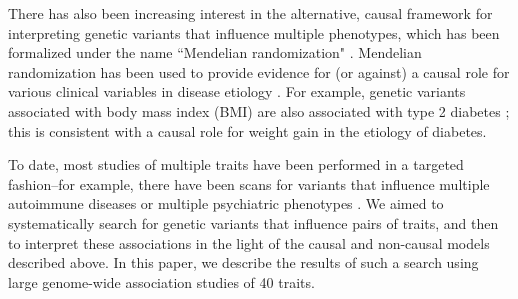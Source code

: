 \documentclass[11pt,titlepage]{article}
\begin{document}
There has also been increasing interest in the alternative, causal framework for interpreting genetic variants that influence multiple phenotypes, which has been formalized under the name ``Mendelian randomization" \citep{Katan:1986aa, smith2004mendelian, Davey-Smith:2014aa}. 
Mendelian randomization has been used to provide evidence for (or against) a causal role for various clinical variables in disease etiology \citep{Voight:2012aa, Lim:2014aa, Panoutsopoulou:2013aa, Holmes:2014aa, De-Silva:2011aa, Granell:2014aa, Pichler:2013aa}. 
For example, genetic variants associated with body mass index (BMI) are also associated with type 2 diabetes \citep{Holmes:2014aa}; this is consistent with a causal role for weight gain in the etiology of diabetes.

To date, most studies of multiple traits have been performed in a targeted fashion--for example, there have been scans for variants that influence multiple autoimmune diseases \citep{Cotsapas:2011aa} or multiple psychiatric phenotypes \citep{Cross-Disorder-Group-of-the-Psychiatric-Genomics-Consortium:2013aa}. 
We aimed to systematically search for genetic variants that influence pairs of traits, and then to interpret these associations in the light of the causal and non-causal models described above.  
In this paper, we describe the results of such a search using large genome-wide association studies of 40 traits.  
\end{document}
